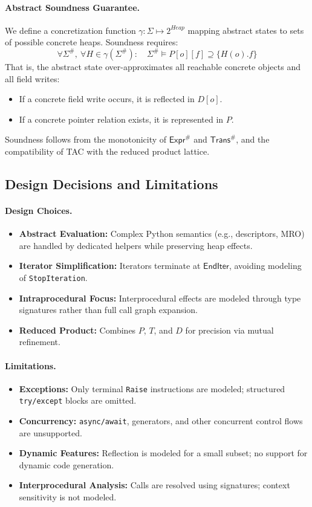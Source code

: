 \paragraph{Abstract Soundness Guarantee.}
We define a concretization function $\gamma: \Sigma \mapsto 2^{\mathit{Heap}}$ mapping abstract states to sets of possible concrete heaps.  
Soundness requires:
\[
\forall \Sigma^\#,\ \forall H \in \gamma(\Sigma^\#):
    \quad \Sigma^\# \models P[o][f] \supseteq \{ H(o).f \}
\]
That is, the abstract state over-approximates all reachable concrete objects and all field writes:
\begin{itemize}
    \item If a concrete field write occurs, it is reflected in $D[o]$.
    \item If a concrete pointer relation exists, it is represented in $P$.
\end{itemize}
Soundness follows from the monotonicity of $\mathsf{Expr}^\#$ and $\mathsf{Trans}^\#$, and the compatibility of TAC with the reduced product lattice.

\subsection{Design Decisions and Limitations}

\paragraph{Design Choices.}
\begin{itemize}
    \item \textbf{Abstract Evaluation:} Complex Python semantics (e.g., descriptors, MRO) are handled by dedicated helpers while preserving heap effects.
    \item \textbf{Iterator Simplification:} Iterators terminate at $\mathsf{EndIter}$, avoiding modeling of \texttt{StopIteration}.
    \item \textbf{Intraprocedural Focus:} Interprocedural effects are modeled through type signatures rather than full call graph expansion.
    \item \textbf{Reduced Product:} Combines $P$, $T$, and $D$ for precision via mutual refinement.
\end{itemize}

\paragraph{Limitations.}
\begin{itemize}
    \item \textbf{Exceptions:} Only terminal \texttt{Raise} instructions are modeled; structured \texttt{try/except} blocks are omitted.
    \item \textbf{Concurrency:} \texttt{async/await}, generators, and other concurrent control flows are unsupported.
    \item \textbf{Dynamic Features:} Reflection is modeled for a small subset; no support for dynamic code generation.
    \item \textbf{Interprocedural Analysis:} Calls are resolved using signatures; context sensitivity is not modeled.
\end{itemize}

